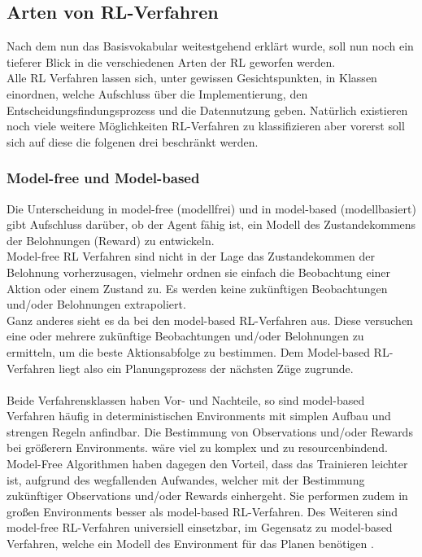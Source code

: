 \subsection{Arten von RL-Verfahren}
Nach dem nun das Basisvokabular weitestgehend erklärt wurde, soll nun noch ein tieferer Blick in die verschiedenen Arten der RL geworfen werden.\\
Alle RL Verfahren lassen sich, unter gewissen Gesichtspunkten, in Klassen einordnen, welche Aufschluss über die Implementierung, den Entscheidungsfindungsprozess und die Datennutzung geben. 
Natürlich existieren noch viele weitere Möglichkeiten RL-Verfahren zu klassifizieren aber vorerst soll sich auf diese die folgenen drei beschränkt werden.

\subsubsection{Model-free und Model-based}
Die Unterscheidung in model-free (modellfrei) und in model-based (modellbasiert) gibt Aufschluss darüber, ob der Agent fähig ist, ein Modell des Zustandekommens der Belohnungen (Reward) zu entwickeln.\\
Model-free RL Verfahren sind nicht in der Lage das Zustandekommen der Belohnung vorherzusagen, vielmehr ordnen sie einfach die Beobachtung einer Aktion oder einem Zustand zu. Es werden keine zukünftigen Beobachtungen und/oder Belohnungen extrapoliert. 
\cite[S. 303 ff. / S. 100 ]{Sutton1998, DRL_Lapan}\\
Ganz anderes sieht es da bei den model-based RL-Verfahren aus. Diese versuchen eine oder mehrere zukünftige Beobachtungen und/oder Belohnungen zu ermitteln, um die beste Aktionsabfolge zu bestimmen. Dem Model-based RL-Verfahren liegt also ein Planungsprozess der nächsten Züge zugrunde. \cite[S. 303 ff.]{Sutton1998}\\
\\Beide Verfahrensklassen haben Vor- und Nachteile, so sind model-based Verfahren häufig in deterministischen Environments mit simplen Aufbau und strengen Regeln anfindbar. Die Bestimmung von Observations und/oder Rewards bei größerern Environments. wäre viel zu komplex und zu resourcenbindend. Model-Free Algorithmen haben dagegen den Vorteil, dass das Trainieren leichter ist, aufgrund des wegfallenden Aufwandes, welcher mit der Bestimmung zukünftiger Observations und/oder Rewards einhergeht. Sie performen zudem in großen Environments besser als model-based RL-Verfahren. Des Weiteren sind model-free RL-Verfahren universiell einsetzbar, im Gegensatz zu model-based Verfahren, welche ein Modell des Environment für das Planen benötigen \cite[S. 100 ff.]{DRL_Lapan}.

